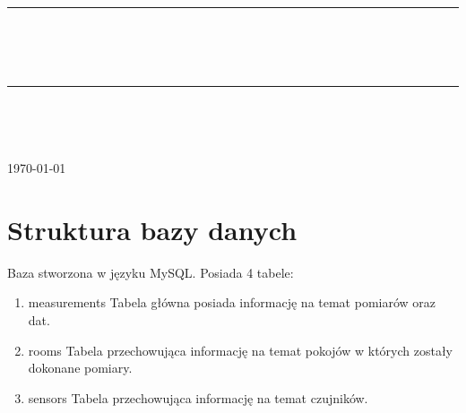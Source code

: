 \documentclass[10pt, a4paper]{article}
\begin{document}
\def\tablename{Tabela}	%

\begin{titlepage}
	\begin{center}
		\textsc{\LARGE \formakursu}\\[1cm]		
		\textsc{\Large \kurs}\\[0.5cm]		
		\rule{\textwidth}{0.08cm}\\[0.4cm]
		{\huge \bfseries \doctype}\\[1cm]
		{\huge \bfseries \projectname}\\[0.5cm]
		\rule{\textwidth}{0.08cm}\\[1cm]
		
		\begin{flushright} \large
		\osobaA\\[0.4cm]

		

		
		\end{flushright}
		
		\vfill
		
		{\large \today}
	\end{center}	
\end{titlepage}

\newpage

\section{Struktura bazy danych}
	Baza stworzona w języku MySQL. Posiada 4 tabele:
	\begin{enumerate}
		\item measurements
		\newline
		Tabela główna posiada informację na temat pomiarów oraz dat.
		
		\item rooms
		\newline
		Tabela przechowująca informację na temat pokojów w których zostały dokonane pomiary.
		
		\item sensors
		\newline
		Tabela przechowująca informację na temat czujników.
	\end{enumerate}
\end{document}
